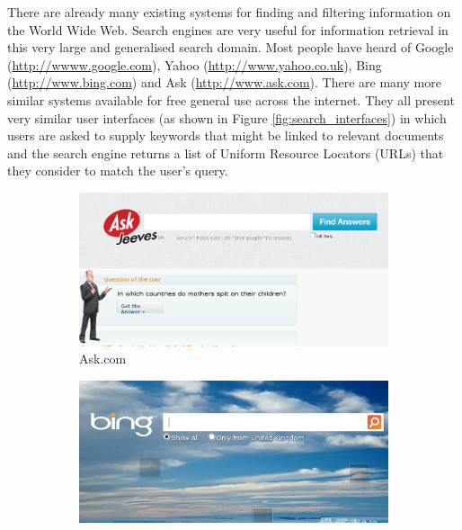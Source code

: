 \documentclass[12pt,a4paper]{article}
\begin{document}
There are already many existing systems for finding and filtering information
on the World Wide Web. Search engines are very useful for information retrieval
in this very large and generalised search domain. Most people have heard of
Google (\url{http://wwww.google.com}), Yahoo (\url{http://www.yahoo.co.uk}),
Bing (\url{http://www.bing.com}) and Ask (\url{http://www.ask.com}). There are
many more similar systems available for free general use across the internet.
They all present very similar user interfaces (as shown in Figure
\ref{fig:search_interfaces}) in which users are asked to supply keywords that
might be linked to relevant documents and the search engine returns a list of
Uniform Resource Locators (URLs) that they consider to match the user's query.


\begin{figure}[!ht]
        \centering
        \begin{subfigure}[b]{0.50\textwidth}
                \centering
                \includegraphics[width=\textwidth]{images/ask_front.png}
                \caption{Ask.com}
                \label{fig:ask_interface}
        \end{subfigure}%
        \begin{subfigure}[b]{0.50\textwidth}
                \centering
                \includegraphics[width=\textwidth]{images/bing_front.png}

\end{subfigure}
\end{figure}
\end{document}
